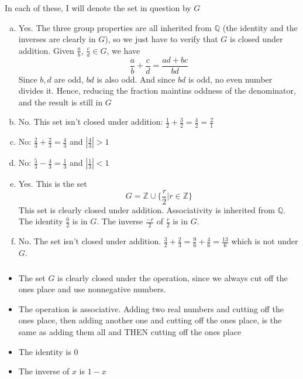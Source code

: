 \documentclass{article}
\newcommand{\ints}{\mathbb{Z}}
\newcommand{\rats}{\mathbb{Q}}
\newcommand{\set}[1]{ \{ #1 \} }
\newcommand{\abs}[1]{| #1 |}
\begin{document}
\subsubsection{}
In each of these, I will denote the set in question by $G$
\begin{enumerate}[(a)]
\item Yes. The three group properties are all inherited from $\rats$ (the identity and the inverses are clearly in $G$), so we just have to verify that $G$ is closed under addition. Given $\frac{a}{b}$, $\frac{c}{d} \in G$, we have
\begin{equation*}
\frac{a}{b} + \frac{c}{d} = \frac{ad+bc}{bd}
\end{equation*}
Since $b,d$ are odd, $bd$ is also odd. And since $bd$ is odd, no even number divides it. Hence, reducing the fraction maintins oddness of the denominator, and the result is still in $G$

\item No. This set isn't closed under addition: $\frac{1}{2} + \frac{3}{2} = \frac{4}{2} = \frac{2}{1}$

\item No: $\frac{2}{3} + \frac{2}{3} = \frac{4}{3}$ and $\abs{\frac{4}{3}} > 1$

\item No: $\frac{5}{3} - \frac{4}{3} = \frac{1}{3}$ and $\abs{\frac{1}{3}} < 1$

\item Yes. This is the set 
\begin{equation*}
G = \ints \cup \set{\frac{r}{2} | r \in \ints}
\end{equation*}
This set is clearly closed under addition. Associativity is inherited from $\rats$. The identity $\frac{0}{2}$ is in $G$. The inverse $\frac{-r}{2}$ of $\frac{r}{2}$ is in $G$. 

\item No. The set isn't closed under addition. $\frac{3}{2} + \frac{2}{3} = \frac{9}{6} + \frac{4}{6} = \frac{13}{6}$ which is not under $G$.
\end{enumerate}
\subsubsection{}
\begin{itemize}
\item The set $G$ is clearly closed under the operation, since we always cut off the ones place and use nonnegative numbers.
\item The operation is associative. Adding two real numbers and cutting off the ones place, then adding another one and cutting off the ones place, is the same as adding them all and THEN cutting off the ones place
\item The identity is $0$
\item The inverse of $x$ is $1-x$
\end{itemize}
\end{document}
